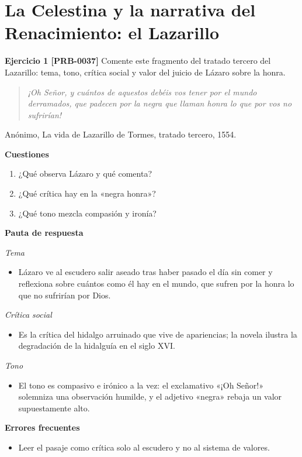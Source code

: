 \documentclass{book}
\begin{document}
\section{La Celestina y la narrativa del Renacimiento: el Lazarillo}

\noindent\textbf{Ejercicio 1 [PRB-0037]}
Comente este fragmento del tratado tercero del Lazarillo: tema, tono, crítica social y valor del juicio de Lázaro sobre la honra.


\begin{quote}
\itshape ¡Oh Señor, y cuántos de aquestos debéis vos tener por el mundo derramados, que padecen por la negra que llaman honra lo que por vos no sufrirían!
\end{quote}
{\noindent\footnotesize Anónimo, La vida de Lazarillo de Tormes, tratado tercero, 1554.\par}

\noindent\textbf{Cuestiones}
\begin{enumerate}
\item ¿Qué observa Lázaro y qué comenta?
\item ¿Qué crítica hay en la «negra honra»?
\item ¿Qué tono mezcla compasión y ironía?
\end{enumerate}

\noindent\textbf{Pauta de respuesta}

\noindent\textit{Tema}
\begin{itemize}
\item Lázaro ve al escudero salir aseado tras haber pasado el día sin comer y reflexiona sobre cuántos como él hay en el mundo, que sufren por la honra lo que no sufrirían por Dios.
\end{itemize}

\noindent\textit{Crítica social}
\begin{itemize}
\item Es la crítica del hidalgo arruinado que vive de apariencias; la novela ilustra la degradación de la hidalguía en el siglo XVI.
\end{itemize}

\noindent\textit{Tono}
\begin{itemize}
\item El tono es compasivo e irónico a la vez: el exclamativo «¡Oh Señor!» solemniza una observación humilde, y el adjetivo «negra» rebaja un valor supuestamente alto.
\end{itemize}

\noindent\textbf{Errores frecuentes}
\begin{itemize}
\item Leer el pasaje como crítica solo al escudero y no al sistema de valores.
\end{itemize}
\end{document}
